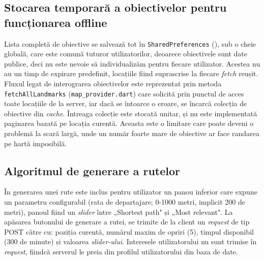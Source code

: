 \documentclass[12pt,a4paper]{report}
\begin{document}
\subsection{Stocarea temporară a obiectivelor pentru funcționarea offline}

Lista completă de obiective se salvează tot în \texttt{SharedPreferences} (), sub o cheie globală, care este comună tuturor utilizatorilor, deoarece obiectivele sunt date publice, deci nu este nevoie să individualizăm pentru fiecare utilizator. Acestea nu au un timp de expirare predefinit, locațiile fiind suprascrise la fiecare \textit{fetch} reușit. Fluxul legat de interograrea obiectivelor este reprezentat prin metoda \texttt{fetchAllLandmarks} (\texttt{map\_provider.dart}) care solicită prin punctul de acces  toate locațiile de la server, iar dacă se întoarce o eroare, se încarcă colecția de obiective din \textit{cache}. Întreaga colecție este stocată unitar, și nu este implementată paginarea bazată pe locația curentă. Aceasta este o limitare care poate deveni o problemă la scară largă, unde un număr foarte mare de obiective ar face randarea pe hartă imposibilă.

\subsection{Algoritmul de generare a rutelor}

În generarea unei rute este inclus pentru utilizator un panou inferior care expune un parametru configurabil (rata de departajare; 0-1000 metri, implicit 200 de metri), panoul fiind un \textit{slider} între „Shortest path" și „Most relevant". La apăsarea butonului de generare a rutei, se trimite de la client un \textit{request} de tip POST către  cu: poziția curentă, numărul maxim de opriri (5), timpul disponibil (300 de minute) și valoarea \textit{slider-ului}. Interesele utilizatorului nu sunt trimise în \textit{request}, fiindcă serverul le preia din profilul utilizatorului din baza de date.
\end{document}
